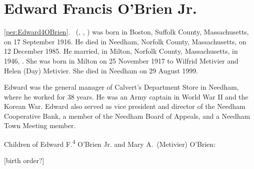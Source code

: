 \section{Edward Francis O'Brien Jr.}

\ref{per:Edward4OBrien}.\  (, , ) was born in Boston, Suffolk County, Massachusetts, on 17 September 1916.\cite{Edward4OBrien2Birth} He died in Needham, Norfolk County, Massachusetts, on 12 December 1985.\cite{Edward4OBrien2Death,Edward2OBrien2Obit} He married, in Milton, Norfolk County, Massachusetts, in 1946, .\cite{Edward4OBrien2Marriage} She was born in Milton on 25 November 1917 to Wilfrid Metivier and Helen (Day) Metivier.\cite{MaryMetivierBirth} She died in Needham on 29 August 1999.\cite{MaryMetivierDeath}

Edward was the general manager of Calvert's Department Store in Needham, where he worked for 38 years. He was an Army captain in World War II and the Korean War. Edward also served as vice president and director of the Needham Cooperative Bank, a member of the Needham Board of Appeals, and a Needham Town Meeting member.\cite{Edward4OBrien2Obit}

\begin{KidsIntro}
	Children of Edward F.\textsuperscript{4} O'Brien Jr. and Mary A.\ (Metivier) O'Brien:
\end{KidsIntro}

\begin{Kids}
	
	
	
\end{Kids}

[birth order?]